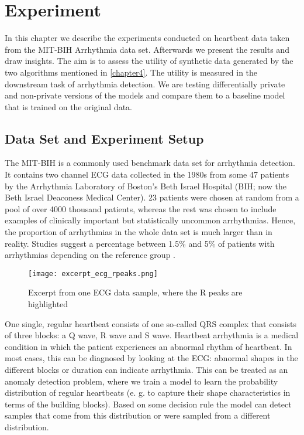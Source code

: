 \section{Experiment}
In this chapter we describe the experiments conducted on heartbeat data taken from the MIT-BIH Arrhythmia data set. Afterwards we present the results and draw insights. The aim is to assess the utility of synthetic data generated by the two algorithms mentioned in \cref{chapter4}. The utility is measured in the downstream task of arrhythmia detection. We are testing differentially private and non-private versions of the models and compare them to a baseline model that is trained on the original data.

\subsection{Data Set and Experiment Setup}
The MIT-BIH is a commonly used benchmark data set for arrhythmia detection. It contains two channel ECG data collected in the 1980s from some 47 patients by the Arrhythmia Laboratory of Boston's Beth Israel Hospital (BIH; now the Beth Israel Deaconess Medical Center). 23 patients were chosen at random from a pool of over 4000 thousand patients, whereas the rest was chosen to include examples of clinically important but statistically uncommon arrhythmias. Hence, the proportion of arrhythmias in the whole data set is much larger than in reality. Studies suggest a percentage between 1.5\% and 5\% of patients with arrhythmias depending on the reference group \parencite{desai2022arrhythmias}. 

\begin{figure}[h]
    \centering
    \texttt{[image: excerpt\_ecg\_rpeaks.png]}
    \caption{Excerpt from one ECG data sample, where the R peaks are highlighted}
\end{figure}

One single, regular heartbeat consists of one so-called QRS complex that consists of three blocks: a Q wave, R wave and S wave. Heartbeat arrhythmia is a medical condition in which the patient experiences an abnormal rhythm of heartbeat. In most cases, this can be diagnosed by looking at the ECG: abnormal shapes in the different blocks or duration can indicate arrhythmia. This can be treated as an anomaly detection problem, where we train a model to learn the probability distribution of regular heartbeats (e. g. to capture their shape characteristics in terms of the building blocks). Based on some decision rule the model can detect samples that come from this distribution or were sampled from a different distribution.

